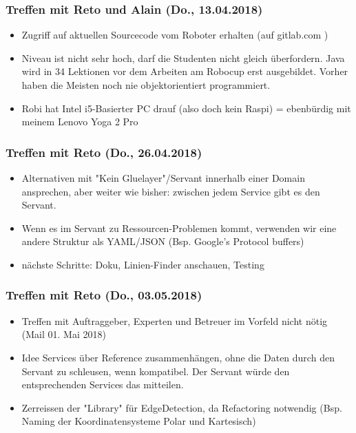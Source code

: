\subsubsection{Treffen mit Reto und Alain (Do., 13.04.2018)}
\begin{itemize}
	\item Zugriff auf aktuellen Sourcecode vom Roboter erhalten (auf gitlab.com \cite{gitlab.com/solidus/hefei})
	\item Niveau ist nicht sehr hoch, darf die Studenten nicht gleich überfordern. Java wird in 34 Lektionen vor dem Arbeiten am Robocup erst ausgebildet. Vorher haben die Meisten noch nie objektorientiert programmiert.
	\item Robi hat Intel i5-Basierter PC drauf (also doch kein Raspi) = ebenbürdig mit meinem Lenovo Yoga 2 Pro
\end{itemize}

\subsubsection{Treffen mit Reto (Do., 26.04.2018)}
\begin{itemize}
	\item Alternativen mit "Kein Gluelayer"/Servant innerhalb einer Domain ansprechen, aber weiter wie bisher: zwischen jedem Service gibt es den Servant.
	\item Wenn es im Servant zu Ressourcen-Problemen kommt, verwenden wir eine andere Struktur als YAML/JSON (Bsp. Google's Protocol buffers)
	\item nächste Schritte: Doku, Linien-Finder anschauen, Testing
\end{itemize}

\subsubsection{Treffen mit Reto (Do., 03.05.2018)}
\begin{itemize}
	\item Treffen mit Auftraggeber, Experten und Betreuer im Vorfeld nicht nötig (Mail 01. Mai 2018)
	\item Idee Services über Reference zusammenhängen, ohne die Daten durch den Servant zu schleusen, wenn kompatibel. Der Servant würde den entsprechenden Services das mitteilen.
	\item Zerreissen der "Library" für EdgeDetection, da Refactoring notwendig (Bsp. Naming der Koordinatensysteme Polar und Kartesisch)
\end{itemize}

